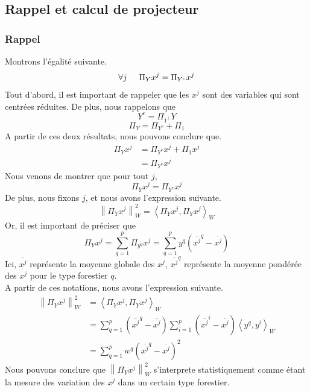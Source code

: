 \documentclass{article}
\begin{document}
\subsection{Rappel et calcul de projecteur}
\subsubsection{Rappel}
Montrons l'égalité suivante. \\
\[
\forall j \hspace{0.5cm} \Pi_Y x^j = \Pi_{Y^c} x^j
\]
Tout d'abord, il est important de rappeler que les $x^j$ sont des variables qui sont
centrées réduites. De plus, nous rappelons que 
\[
Y^c = \Pi_{1^\perp} Y 
\]
\[
\Pi_Y = \Pi_{Y^c} + \Pi_1
\]
A partir de ces deux résultats, nous pouvons conclure que. \\
\begin{align*}
    \Pi_Y x^j & = \Pi_{Y^c} x^j + \Pi_1 x^j \\
    &= \Pi_{Y^c} x^j
\end{align*}
Nous venons de montrer que pour tout $j$, 
\[
\Pi_Y x^j = \Pi_{Y^c} x^j
\]
De plus, nous fixons $j$, et nous avons l'expression suivante.
\[
\left\lVert \Pi_Y x^j \right\rVert^2 _W = \left\langle \Pi_Y x^j,\Pi_Y x^j\right\rangle_W
\]
Or, il est important de préciser que
\[
\Pi_Y x^j=\sum_{q = 1}^{p}\Pi_{y^q} x^j=\sum_{q = 1}^{p}y^q( \overline{x^j}^q - {\overline{x^j}} )  
\]
Ici, $\overline{x^j}$ représente la moyenne globale des $x^j$, $\overline{x^j}^q$ représente la moyenne pondérée des $x^j$ pour le type forestier $q$.\\
A partir de ces notations, nous avons l'expression suivante.
\begin{align*}
    \left\lVert \Pi_Y x^j \right\rVert^2 _W &= \left\langle \Pi_Y x^j,\Pi_Y x^j\right\rangle_W \\
     &=  \sum_{q = 1}^{p}( \overline{x^j}^q - {\overline{x^j}} ) \sum_{ i= 1}^{p}( \overline{x^j}^i - {\overline{x^j}} )\left\langle y^q,y^i\right\rangle_W \\
     &= \sum_{q = 1}^{p}w^q( \overline{x^j}^q - {\overline{x^j}} )^2
\end{align*}
Nous pouvons conclure que $\left\lVert \Pi_Y x^j \right\rVert^2 _W$ s'interprete statistiquement comme
étant la mesure des variation des $x^j$ dans un certain type forestier.
\\
\\
\end{document}
